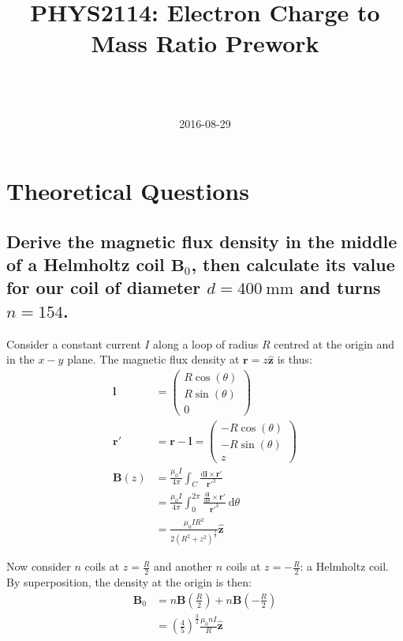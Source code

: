 \documentclass[a4paper]{scrartcl}
\begin{document}
\title{PHYS2114: Electron Charge to Mass Ratio Prework}
\author{ \\ \\ }
\date{2016-08-29}
\maketitle

\section{Theoretical Questions}
\subsection{Derive the magnetic flux density in the middle of a Helmholtz coil \(\mathbf{B}_0\), then calculate its value for our coil of diameter \(d = \SI{400}{\milli\metre}\) and turns \(n = 154\).}
Consider a constant current \(I\) along a loop of radius \(R\) centred at the origin and in the \(x-y\) plane. The magnetic flux density at \(\mathbf{r} = z \mathbf{\hat{z}}\) is thus:
\begin{align*}
    \mathbf{l} &= \begin{pmatrix}R \cos(\theta) \\ R \sin(\theta) \\ 0\end{pmatrix} \\
    \mathbf{r'} &= \mathbf{r} - \mathbf{l} = \begin{pmatrix}-R \cos(\theta) \\ -R \sin(\theta) \\ z\end{pmatrix} \\
    \mathbf{B}(z) &= \frac{\mu_0 I}{4 \pi} \int_C \frac{\mathrm{d}\mathbf{l} \times \mathbf{r'}}{\mathbf{r'}^3} \\
    &= \frac{\mu_0 I}{4 \pi} \int_0^{2 \pi} \frac{\frac{\mathrm{d}\mathbf{l}}{\mathrm{d}\theta} \times \mathbf{r'}}{\mathbf{r'}^3} \:\mathrm{d}\theta \\
    &= \frac{\mu_0 I R^2}{2 (R^2 + z^2)^\frac{3}{2}} \mathbf{\hat{z}}
\end{align*}

Now consider \(n\) coils at \(z = \frac{R}{2}\) and another \(n\) coils at \(z = -\frac{R}{2}\): a Helmholtz coil. By superposition, the density at the origin is then:
\begin{align*}
    \mathbf{B}_0 &= n \mathbf{B}\left(\frac{R}{2}\right) + n \mathbf{B}\left(-\frac{R}{2}\right) \\
    &= \left(\frac{4}{5}\right)^\frac{3}{2} \frac{\mu_0 n I}{R} \mathbf{\hat{z}}
\end{align*}
\end{document}
